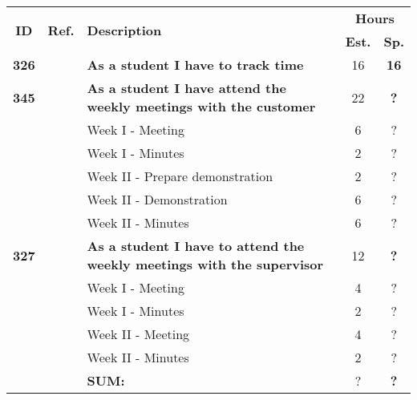 \label{tab:sprint3storiesProcess}
\def\arraystretch{1.25}
 
\begin{longtable}{ccXcc}

\toprule[0.5mm]
\multirow{2}{*}{\textbf{ID}} &
\multirow{2}{*}{\textbf{Ref.}} & \multirow{2}{*}{\textbf{Description}} & \multicolumn{2}{c}{\textbf{Hours}} \\
 					& & & \textbf{Est.} & \textbf{Sp.} \\
\midrule

\textbf{326} 	&& {\bf  As a student I have to track time} 										& 	16	& \textbf{16} \\
	
\textbf{345} 	&& {\bf As a student I have attend the weekly meetings with the customer} 			& 	22	& \textbf{?} \\
		&& Week I - Meeting							&  6 & ? \\
		&& Week I - Minutes							&  2 & ? \\
		&& Week II - Prepare demonstration			&  2 & ? \\
		&& Week II - Demonstration					&  6 & ? \\
		&& Week II - Minutes						&  6 & ? \\


		
\textbf{327} 	&& {\bf As a student I have to attend the weekly meetings with the supervisor} 		& 	12	& \textbf{?} \\
		&& Week I - Meeting							&  4 & ? \\
		&& Week I - Minutes							&  2 & ? \\
		&& Week II - Meeting						&  4 & ? \\
		&& Week II - Minutes						&  2 & ? \\

				
				
\hline
				&& \textbf{SUM:}		&		?	& \textbf{?}
 \\																			
\bottomrule[0.5mm]
\end{longtable}
